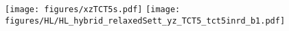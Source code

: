 \begin{table}[!h]
\begin{tabular}{l|c|c}
   \end{tabular}
   \label{tab:IR3leakageFactors}
\end{table}


\begin{figure}
  \centering
  \texttt{[image: figures/xzTCT5s.pdf]}
  \texttt{[image: figures/HL/HL\_hybrid\_relaxedSett\_yz\_TCT5\_tct5inrd\_b1.pdf]}
  \caption{
    \label{}}
\end{figure}





